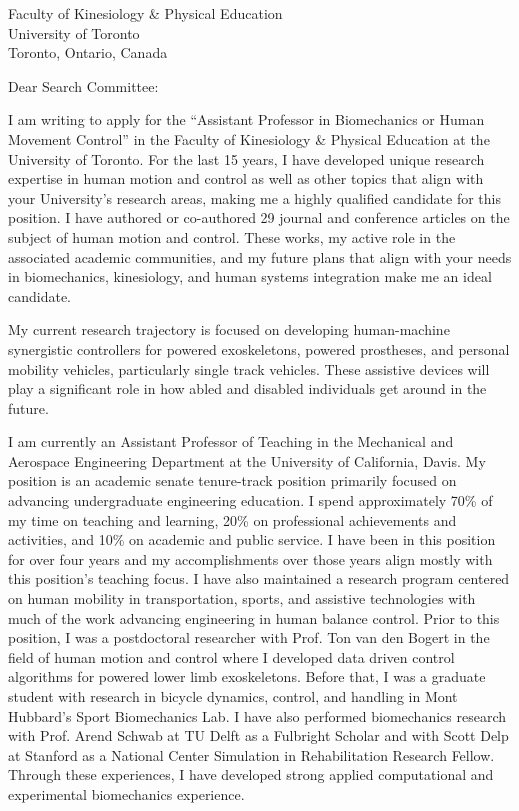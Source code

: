 \documentclass{letter}
\date{}
\begin{document}
\begin{letter}{
  Faculty of Kinesiology \& Physical Education \\
  University of Toronto \\
  Toronto, Ontario, Canada
}

\opening{Dear Search Committee:}

I am writing to apply for the ``Assistant Professor in Biomechanics or Human
Movement Control'' in the Faculty of Kinesiology \& Physical Education at the
University of Toronto. For the last 15 years, I have developed unique research
expertise in human motion and control as well as other topics that align with
your University's research areas, making me a highly qualified candidate for
this position. I have authored or co-authored 29 journal and conference
articles on the subject of human motion and control. These works, my active
role in the associated academic communities, and my future plans that align
with your needs in biomechanics, kinesiology, and human systems integration
make me an ideal candidate.

My current research trajectory is focused on developing human-machine
synergistic controllers for powered exoskeletons, powered prostheses, and
personal mobility vehicles, particularly single track vehicles. These assistive
devices will play a significant role in how abled and disabled individuals get
around in the future.

I am currently an Assistant Professor of Teaching in the Mechanical and
Aerospace Engineering Department at the University of California, Davis. My
position is an academic senate tenure-track position primarily focused on
advancing undergraduate engineering education. I spend approximately 70\% of my
time on teaching and learning, 20\% on professional achievements and
activities, and 10\% on academic and public service. I have been in this
position for over four years and my accomplishments over those years align
mostly with this position's teaching focus. I have also maintained a research
program centered on human mobility in transportation, sports, and assistive
technologies with much of the work advancing engineering in human balance
control. Prior to this position, I was a postdoctoral researcher with Prof. Ton
van den Bogert in the field of human motion and control where I developed data
driven control algorithms for powered lower limb exoskeletons. Before that, I
was a graduate student with research in bicycle dynamics, control, and handling
in Mont Hubbard's Sport Biomechanics Lab. I have also performed biomechanics
research with Prof. Arend Schwab at TU Delft as a Fulbright Scholar and with
Scott Delp at Stanford as a National Center Simulation in Rehabilitation
Research Fellow. Through these experiences, I have developed strong applied
computational and experimental biomechanics experience.


\end{letter}
\end{document}
